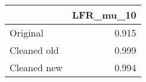 \begin{tabular}{lr}
\toprule
{} & LFR_mu_10 \\
\midrule
Original    &     0.915 \\
Cleaned old &     0.999 \\
Cleaned new &     0.994 \\
\bottomrule
\end{tabular}
